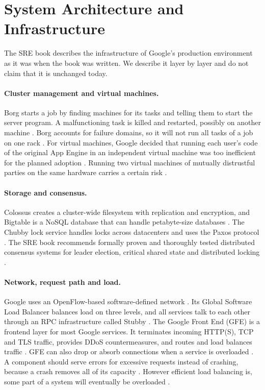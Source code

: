 \section{System Architecture and Infrastructure}

The SRE book describes the infrastructure of Google's production environment as it was when the book was written. We describe it layer by layer and do not claim that it is unchanged today.

\paragraph{Cluster management and virtual machines.}
Borg starts a job by finding machines for its tasks and telling them to start the server program. A malfunctioning task is killed and restarted, possibly on another machine \cite{sre-book}. Borg accounts for failure domains, so it will not run all tasks of a job on one rack \cite{sre-book}. For virtual machines, Google decided that running each user's code of the original App Engine in an independent virtual machine was too inefficient for the planned adoption \cite{bsrs}. Running two virtual machines of mutually distrustful parties on the same hardware carries a certain risk \cite{bsrs}.

\paragraph{Storage and consensus.}
Colossus creates a cluster-wide filesystem with replication and encryption, and Bigtable is a NoSQL database that can handle petabyte-size databases \cite{sre-book}. The Chubby lock service handles locks across datacenters and uses the Paxos protocol \cite{sre-book}. The SRE book recommends formally proven and thoroughly tested distributed consensus systems for leader election, critical shared state and distributed locking \cite{sre-book}.

\paragraph{Network, request path and load.}
Google uses an OpenFlow-based software-defined network \cite{sre-book}. Its Global Software Load Balancer balances load on three levels, and all services talk to each other through an RPC infrastructure called Stubby \cite{sre-book}. The Google Front End (GFE) is a frontend layer for most Google services. It terminates incoming HTTP(S), TCP and TLS traffic, provides DDoS countermeasures, and routes and load balances traffic \cite{bsrs}. GFE can also drop or absorb connections when a service is overloaded \cite{bsrs}. A component should serve errors for excessive requests instead of crashing, because a crash removes all of its capacity \cite{bsrs}. However efficient load balancing is, some part of a system will eventually be overloaded \cite{sre-book}.

